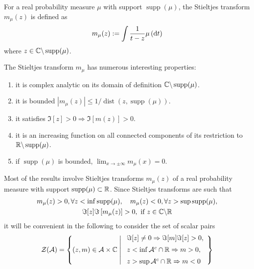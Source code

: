 \begin{definition}
	For a real probability measure \(\mu\) with support \(\operatorname{supp}(\mu)\), the Stieltjes transform \(m_{\mu}(z)\) is defined as
	\begin{equation}
		m_{\mu}(z):=\int\frac{1}{t-z}\mu\left(\mathop{}\!\mathrm{d} t\right)
	\end{equation}
	where \(z\in\mathbb{C}\backslash\operatorname{supp}(\mu)\).
\end{definition}

\begin{property}
	The Stieltjes transform \(m_{\mu}\) has numerous interesting properties:
	\begin{enumerate}
		\item it is complex analytic on its domain of definition \(\mathbb{C} \backslash \operatorname{supp}(\mu)\).
		\item it is bounded \(\left|m_{\mu}(z)\right|\leq 1/\operatorname{dist}(z,\operatorname{supp}(\mu))\).
		\item it satisfies \(\Im[z]>0 \Rightarrow \Im[m(z)]>0\).
		\item it is an increasing function on all connected components of its restriction to \(\mathbb{R}\backslash\operatorname{supp}(\mu)\). %
		\item if \(\operatorname{supp}(\mu)\) is bounded, \(\lim_{x\rightarrow\pm\infty}m_{\mu}(x)=0\).
	\end{enumerate}
\end{property}

\begin{remark}
	Most of the results involve Stieltjes transforms \(m_{\mu}(z)\) of a real probability measure with support \(\operatorname{supp}(\mu) \subset \mathbb{R}\). Since Stieltjes transforms are such that
	\begin{gather*}
		m_{\mu}(z)>0,\forall z<\inf\operatorname{supp}(\mu),\quad m_{\mu}(z)<0,\forall z>\sup \operatorname{supp}(\mu),\\
		\Im[z] \Im\left[m_{\mu}(z)\right]>0,\ \text{if}\ z\in\bbC\backslash\bbR
	\end{gather*}
	it will be convenient in the following to consider the set of scalar pairs
	\begin{equation*}
		\mathcal{Z}(\mathcal{A}) = \left\{
		(z, m) \in \mathcal{A} \times \mathbb{C} \;\middle|\;
		\begin{array}{l}
			\Im[z] \neq 0 \Rightarrow \Im[m] \Im[z] > 0,          \\[0.5em]
			z < \inf \mathcal{A}^{c} \cap \mathbb{R} \Rightarrow m > 0, \\[0.5em]
			z > \sup \mathcal{A}^{c} \cap \mathbb{R} \Rightarrow m < 0
		\end{array}
		\right\}
	\end{equation*}
\end{remark}

